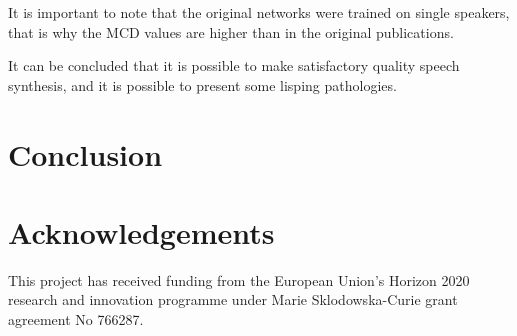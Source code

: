 \documentclass[a4paper]{article}
\begin{document}
It is important to note that the original networks were trained on
single speakers, that is why the MCD values are higher than in the
original publications.

It can be concluded that it is possible to make satisfactory quality
speech synthesis, and it is possible to present some lisping pathologies.

\section{Conclusion}

\section{Acknowledgements}
This project has received funding from the European Union's Horizon
2020 research and innovation programme under Marie Sklodowska-Curie
grant agreement No 766287.






\end{document}
